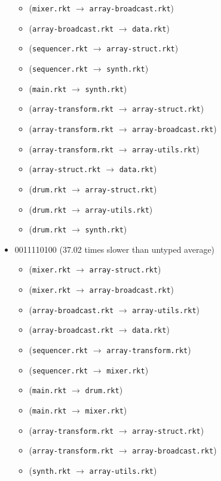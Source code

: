 \documentclass{article}
\newcommand{\mono}[1]{\texttt{#1}}
\begin{document}
\begin{itemize}
\begin{itemize}
  \item (\mono{mixer.rkt} $\rightarrow$ \mono{array-broadcast.rkt})
  \item (\mono{array-broadcast.rkt} $\rightarrow$ \mono{data.rkt})
  \item (\mono{sequencer.rkt} $\rightarrow$ \mono{array-struct.rkt})
  \item (\mono{sequencer.rkt} $\rightarrow$ \mono{synth.rkt})
  \item (\mono{main.rkt} $\rightarrow$ \mono{synth.rkt})
  \item (\mono{array-transform.rkt} $\rightarrow$ \mono{array-struct.rkt})
  \item (\mono{array-transform.rkt} $\rightarrow$ \mono{array-broadcast.rkt})
  \item (\mono{array-transform.rkt} $\rightarrow$ \mono{array-utils.rkt})
  \item (\mono{array-struct.rkt} $\rightarrow$ \mono{data.rkt})
  \item (\mono{drum.rkt} $\rightarrow$ \mono{array-struct.rkt})
  \item (\mono{drum.rkt} $\rightarrow$ \mono{array-utils.rkt})
  \item (\mono{drum.rkt} $\rightarrow$ \mono{synth.rkt})
  \end{itemize}
\item 0011110100 (37.02 times slower than untyped average)
  \begin{itemize}
  \item (\mono{mixer.rkt} $\rightarrow$ \mono{array-struct.rkt})
  \item (\mono{mixer.rkt} $\rightarrow$ \mono{array-broadcast.rkt})
  \item (\mono{array-broadcast.rkt} $\rightarrow$ \mono{array-utils.rkt})
  \item (\mono{array-broadcast.rkt} $\rightarrow$ \mono{data.rkt})
  \item (\mono{sequencer.rkt} $\rightarrow$ \mono{array-transform.rkt})
  \item (\mono{sequencer.rkt} $\rightarrow$ \mono{mixer.rkt})
  \item (\mono{main.rkt} $\rightarrow$ \mono{drum.rkt})
  \item (\mono{main.rkt} $\rightarrow$ \mono{mixer.rkt})
  \item (\mono{array-transform.rkt} $\rightarrow$ \mono{array-struct.rkt})
  \item (\mono{array-transform.rkt} $\rightarrow$ \mono{array-broadcast.rkt})
  \item (\mono{synth.rkt} $\rightarrow$ \mono{array-utils.rkt})

\end{itemize}
\end{itemize}
\end{document}
